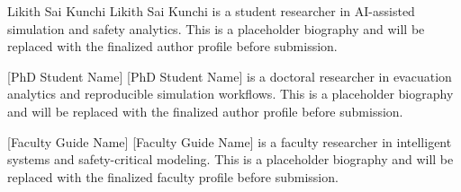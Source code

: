 \documentclass[journal]{IEEEtran}
\begin{document}
\begin{IEEEbiographynophoto}{Likith Sai Kunchi}
Likith Sai Kunchi is a student researcher in AI-assisted simulation and safety analytics. This is a placeholder biography and will be replaced with the finalized author profile before submission.
\end{IEEEbiographynophoto}

\begin{IEEEbiographynophoto}{[PhD Student Name]}
[PhD Student Name] is a doctoral researcher in evacuation analytics and reproducible simulation workflows. This is a placeholder biography and will be replaced with the finalized author profile before submission.
\end{IEEEbiographynophoto}

\begin{IEEEbiographynophoto}{[Faculty Guide Name]}
[Faculty Guide Name] is a faculty researcher in intelligent systems and safety-critical modeling. This is a placeholder biography and will be replaced with the finalized faculty profile before submission.
\end{IEEEbiographynophoto}
\end{document}
